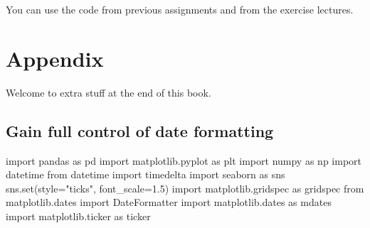 \documentclass[
  letterpaper,
  DIV=11,
  numbers=noendperiod]{scrreprt}
\newenvironment{Shaded}{\begin{snugshade}}{\end{snugshade}}
\newcommand{\BuiltInTok}[1]{\textcolor[rgb]{0.00,0.23,0.31}{#1}}
\newcommand{\FloatTok}[1]{\textcolor[rgb]{0.68,0.00,0.00}{#1}}
\newcommand{\ImportTok}[1]{\textcolor[rgb]{0.00,0.46,0.62}{#1}}
\newcommand{\NormalTok}[1]{\textcolor[rgb]{0.00,0.23,0.31}{#1}}
\newcommand{\OperatorTok}[1]{\textcolor[rgb]{0.37,0.37,0.37}{#1}}
\newcommand{\StringTok}[1]{\textcolor[rgb]{0.13,0.47,0.30}{#1}}
\begin{document}
You can use the code from previous assignments and from the exercise
lectures.

\part{Appendix}

Welcome to extra stuff at the end of this book.

\hypertarget{gain-full-control-of-date-formatting}{%
\chapter{Gain full control of date
formatting}\label{gain-full-control-of-date-formatting}}

\begin{Shaded}
\begin{Highlighting}[]
\ImportTok{import}\NormalTok{ pandas }\ImportTok{as}\NormalTok{ pd}
\ImportTok{import}\NormalTok{ matplotlib.pyplot }\ImportTok{as}\NormalTok{ plt}
\ImportTok{import}\NormalTok{ numpy }\ImportTok{as}\NormalTok{ np}
\ImportTok{import}\NormalTok{ datetime}
\ImportTok{from}\NormalTok{ datetime }\ImportTok{import}\NormalTok{ timedelta}
\ImportTok{import}\NormalTok{ seaborn }\ImportTok{as}\NormalTok{ sns}
\NormalTok{sns.}\BuiltInTok{set}\NormalTok{(style}\OperatorTok{=}\StringTok{"ticks"}\NormalTok{, font\_scale}\OperatorTok{=}\FloatTok{1.5}\NormalTok{)}
\ImportTok{import}\NormalTok{ matplotlib.gridspec }\ImportTok{as}\NormalTok{ gridspec}
\ImportTok{from}\NormalTok{ matplotlib.dates }\ImportTok{import}\NormalTok{ DateFormatter}
\ImportTok{import}\NormalTok{ matplotlib.dates }\ImportTok{as}\NormalTok{ mdates}
\ImportTok{import}\NormalTok{ matplotlib.ticker }\ImportTok{as}\NormalTok{ ticker}
\end{Highlighting}
\end{Shaded}
\end{document}
